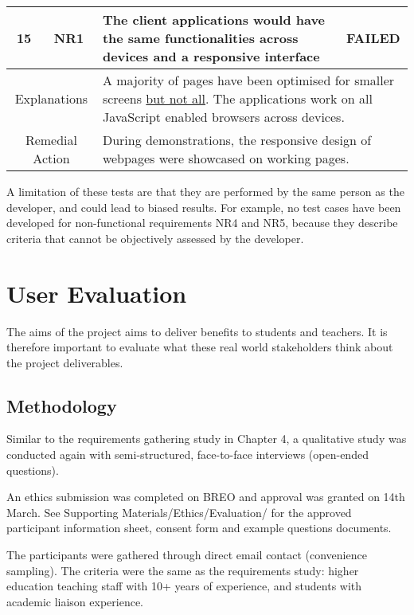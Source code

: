 \begin{table}[!ht]	
	\begin{tabularx}{\textwidth}{|c|c|X|c|}
		\hline
		15 & NR1 & \textbf{The client applications would have the same functionalities
		across devices and a responsive interface} & \cellcolor{pink}FAILED \\
		\hline
		\multicolumn{2}{|c|}{Explanations} & \multicolumn{2}{X|}{
			A majority of pages have been optimised for smaller screens \underline{but not all}. 
			The applications work on all JavaScript enabled browsers across devices.
		   }      \\
		\hline
		\multicolumn{2}{|c|}{Remedial Action} & \multicolumn{2}{X|}{During demonstrations, the responsive design of webpages were showcased on working pages.}                                                                                                  \\
		\hline
	\end{tabularx}	
\end{table}

A limitation of these tests are that they are performed by the same person as the developer,
and could lead to biased results.
For example, no test cases have been developed for non-functional requirements NR4 and NR5,
because they describe criteria that cannot be objectively assessed by the developer.

\section{User Evaluation}

The aims of the project aims to deliver benefits to students and teachers.
It is therefore important to evaluate what these real world stakeholders think about the project deliverables.

\subsection{Methodology}

Similar to the requirements gathering study in Chapter 4, a qualitative study was conducted
again with semi-structured, face-to-face interviews (open-ended questions).

An ethics submission was completed on BREO and approval was granted on 14th March.
See Supporting Materials/Ethics/Evaluation/ for the approved
participant information sheet, consent form and example questions documents.

The participants were gathered through direct email contact (convenience sampling).
The criteria were the same as the requirements study: higher education teaching staff
with 10+ years of experience, and students with academic liaison experience.

